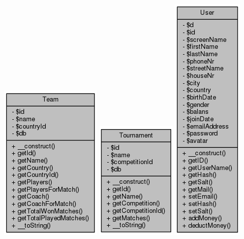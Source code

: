 \documentclass[11pt]{article}
\begin{document}
\includegraphics[scale=0.4]{UML_Team.png}
\includegraphics[scale=0.4]{UML_Tournament.png}
\includegraphics[scale=0.4]{UML_User.png}
\end{document}
